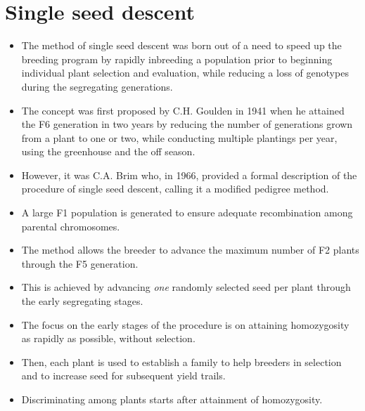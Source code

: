 \documentclass[11pt,ignorenonframetext,aspectratio=169]{beamer}
\providecommand{\tightlist}{%
  \setlength{\itemsep}{0pt}\setlength{\parskip}{0pt}}
\begin{document}
\hypertarget{single-seed-descent}{%
\section{Single seed descent}\label{single-seed-descent}}

\begin{frame}{}
\protect\hypertarget{section-10}{}
\begin{itemize}
\tightlist
\item
  The method of single seed descent was born out of a need to speed up
  the breeding program by rapidly inbreeding a population prior to
  beginning individual plant selection and evaluation, while reducing a
  loss of genotypes during the segregating generations.
\item
  The concept was first proposed by C.H. Goulden in 1941 when he
  attained the F6 generation in two years by reducing the number of
  generations grown from a plant to one or two, while conducting
  multiple plantings per year, using the greenhouse and the off season.
\item
  However, it was C.A. Brim who, in 1966, provided a formal description
  of the procedure of single seed descent, calling it a modified
  pedigree method.
\end{itemize}
\end{frame}

\begin{frame}{}
\protect\hypertarget{section-11}{}
\begin{itemize}
\tightlist
\item
  A large F1 population is generated to ensure adequate recombination
  among parental chromosomes.
\item
  The method allows the breeder to advance the maximum number of F2
  plants through the F5 generation.
\item
  This is achieved by advancing \emph{one} randomly selected seed per
  plant through the early segregating stages.
\item
  The focus on the early stages of the procedure is on attaining
  homozygosity as rapidly as possible, without selection.
\item
  Then, each plant is used to establish a family to help breeders in
  selection and to increase seed for subsequent yield trails.
\item
  Discriminating among plants starts after attainment of homozygosity.
\end{itemize}
\end{frame}
\end{document}
